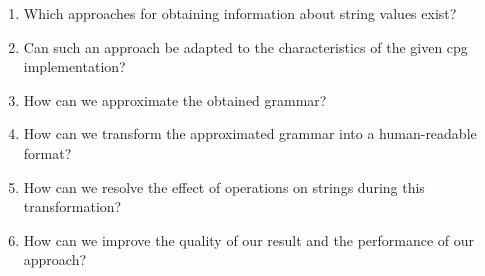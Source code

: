 \begin{enumerate}[noitemsep]
	\item Which approaches for obtaining information about string values exist?
	\item Can such an approach be adapted to the characteristics of the given \ac{cpg}\\ implementation?
	\item How can we approximate the obtained grammar?
	\item How can we transform the approximated grammar into a human-readable format?
	\item How can we resolve the effect of operations on strings during this transformation?
	\item How can we improve the quality of our result and the performance of our approach?
\end{enumerate}

\begin{comment}
	
The introduction is a bit like a teaser. Here, you dig more into details, also
technical ones. After this chapter, the reader must understand why you do this
work, why it's important, what makes it difficult and what you want to achieve.

\begin{itemize}
\item What's the problem that you're trying to solve?
\item What is your goal?
\item What is/are the research question(s)?
\item What are special problems?
\end{itemize}

Probably 1-3 pages

\end{comment}
